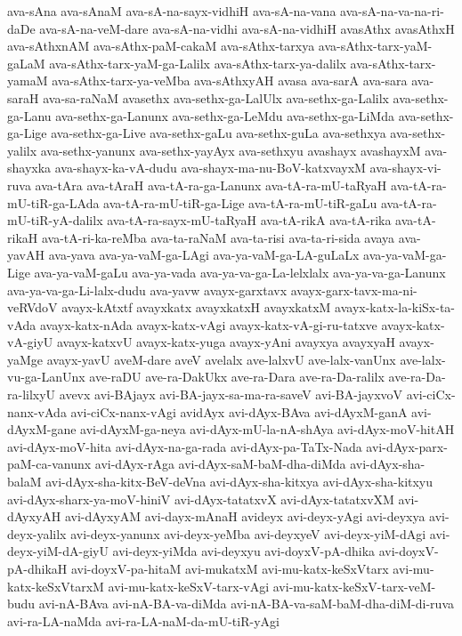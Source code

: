 {ava-sAna
ava-sAnaM
ava-sA-na-sayx-vidhiH
ava-sA-na-vana
ava-sA-na-va-na-ri-daDe
ava-sA-na-veM-dare
ava-sA-na-vidhi
ava-sA-na-vidhiH
avasAthx
avasAthxH
ava-sAthxnAM
ava-sAthx-paM-cakaM
ava-sAthx-tarxya
ava-sAthx-tarx-yaM-gaLaM
ava-sAthx-tarx-yaM-ga-Lalilx
ava-sAthx-tarx-ya-dalilx
ava-sAthx-tarx-yamaM
ava-sAthx-tarx-ya-veMba
ava-sAthxyAH
avasa
ava-sarA
ava-sara
ava-saraH
ava-sa-raNaM
avasethx
ava-sethx-ga-LalUlx
ava-sethx-ga-Lalilx
ava-sethx-ga-Lanu
ava-sethx-ga-Lanunx
ava-sethx-ga-LeMdu
ava-sethx-ga-LiMda
ava-sethx-ga-Lige
ava-sethx-ga-Live
ava-sethx-gaLu
ava-sethx-guLa
ava-sethxya
ava-sethx-yalilx
ava-sethx-yanunx
ava-sethx-yayAyx
ava-sethxyu
avashayx
avashayxM
ava-shayxka
ava-shayx-ka-vA-dudu
ava-shayx-ma-nu-BoV-katxvayxM
ava-shayx-vi-ruva
ava-tAra
ava-tAraH
ava-tA-ra-ga-Lanunx
ava-tA-ra-mU-taRyaH
ava-tA-ra-mU-tiR-ga-LAda
ava-tA-ra-mU-tiR-ga-Lige
ava-tA-ra-mU-tiR-gaLu
ava-tA-ra-mU-tiR-yA-dalilx
ava-tA-ra-sayx-mU-taRyaH
ava-tA-rikA
ava-tA-rika
ava-tA-rikaH
ava-tA-ri-ka-reMba
ava-ta-raNaM
ava-ta-risi
ava-ta-ri-sida
avaya
ava-yavAH
ava-yava
ava-ya-vaM-ga-LAgi
ava-ya-vaM-ga-LA-guLaLx
ava-ya-vaM-ga-Lige
ava-ya-vaM-gaLu
ava-ya-vada
ava-ya-va-ga-La-lelxlalx
ava-ya-va-ga-Lanunx
ava-ya-va-ga-Li-lalx-dudu
ava-yavw
avayx-garxtavx
avayx-garx-tavx-ma-ni-veRVdoV
avayx-kAtxtf
avayxkatx
avayxkatxH
avayxkatxM
avayx-katx-la-kiSx-ta-vAda
avayx-katx-nAda
avayx-katx-vAgi
avayx-katx-vA-gi-ru-tatxve
avayx-katx-vA-giyU
avayx-katxvU
avayx-katx-yuga
avayx-yAni
avayxya
avayxyaH
avayx-yaMge
avayx-yavU
aveM-dare
aveV
avelalx
ave-lalxvU
ave-lalx-vanUnx
ave-lalx-vu-ga-LanUnx
ave-raDU
ave-ra-DakUkx
ave-ra-Dara
ave-ra-Da-ralilx
ave-ra-Da-ra-lilxyU
avevx
avi-BAjayx
avi-BA-jayx-sa-ma-ra-saveV
avi-BA-jayxvoV
avi-ciCx-nanx-vAda
avi-ciCx-nanx-vAgi
avidAyx
avi-dAyx-BAva
avi-dAyxM-ganA
avi-dAyxM-gane
avi-dAyxM-ga-neya
avi-dAyx-mU-la-nA-shAya
avi-dAyx-moV-hitAH
avi-dAyx-moV-hita
avi-dAyx-na-ga-rada
avi-dAyx-pa-TaTx-Nada
avi-dAyx-parx-paM-ca-vanunx
avi-dAyx-rAga
avi-dAyx-saM-baM-dha-diMda
avi-dAyx-sha-balaM
avi-dAyx-sha-kitx-BeV-deVna
avi-dAyx-sha-kitxya
avi-dAyx-sha-kitxyu
avi-dAyx-sharx-ya-moV-hiniV
avi-dAyx-tatatxvX
avi-dAyx-tatatxvXM
avi-dAyxyAH
avi-dAyxyAM
avi-dayx-mAnaH
avideyx
avi-deyx-yAgi
avi-deyxya
avi-deyx-yalilx
avi-deyx-yanunx
avi-deyx-yeMba
avi-deyxyeV
avi-deyx-yiM-dAgi
avi-deyx-yiM-dA-giyU
avi-deyx-yiMda
avi-deyxyu
avi-doyxV-pA-dhika
avi-doyxV-pA-dhikaH
avi-doyxV-pa-hitaM
avi-mukatxM
avi-mu-katx-keSxVtarx
avi-mu-katx-keSxVtarxM
avi-mu-katx-keSxV-tarx-vAgi
avi-mu-katx-keSxV-tarx-veM-budu
avi-nA-BAva
avi-nA-BA-va-diMda
avi-nA-BA-va-saM-baM-dha-diM-di-ruva
avi-ra-LA-naMda
avi-ra-LA-naM-da-mU-tiR-yAgi
}
